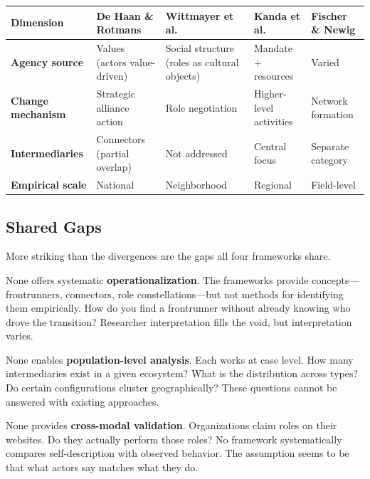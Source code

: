 \documentclass[../main.tex]{subfiles}
\begin{document}
\tableminimal
\begin{center}
\begin{tabular}{@{}p{2.5cm}p{3cm}p{3cm}p{3cm}p{2.5cm}@{}}
\toprule
\textbf{Dimension} & \textbf{De Haan \& Rotmans} & \textbf{Wittmayer et al.} & \textbf{Kanda et al.} & \textbf{Fischer \& Newig} \\
\midrule

\textbf{Agency source} &
Values (actors value-driven) &
Social structure (roles as cultural objects) &
Mandate + resources &
Varied \\

\textbf{Change mechanism} &
Strategic alliance action &
Role negotiation &
Higher-level activities &
Network formation \\

\textbf{Intermediaries} &
Connectors (partial overlap) &
Not addressed &
Central focus &
Separate category \\

\textbf{Empirical scale} &
National &
Neighborhood &
Regional &
Field-level \\

\bottomrule
\end{tabular}
\label{tab:background:divergence}
\end{center}

\subsection{Shared Gaps}

More striking than the divergences are the gaps all four frameworks share.

None offers systematic \textbf{operationalization}. The frameworks provide concepts---frontrunners, connectors, role constellations---but not methods for identifying them empirically. How do you find a frontrunner without already knowing who drove the transition? Researcher interpretation fills the void, but interpretation varies.

None enables \textbf{population-level analysis}. Each works at case level. How many intermediaries exist in a given ecosystem? What is the distribution across types? Do certain configurations cluster geographically? These questions cannot be answered with existing approaches.

None provides \textbf{cross-modal validation}. Organizations claim roles on their websites. Do they actually perform those roles? No framework systematically compares self-description with observed behavior. The assumption seems to be that what actors say matches what they do.
\end{document}
